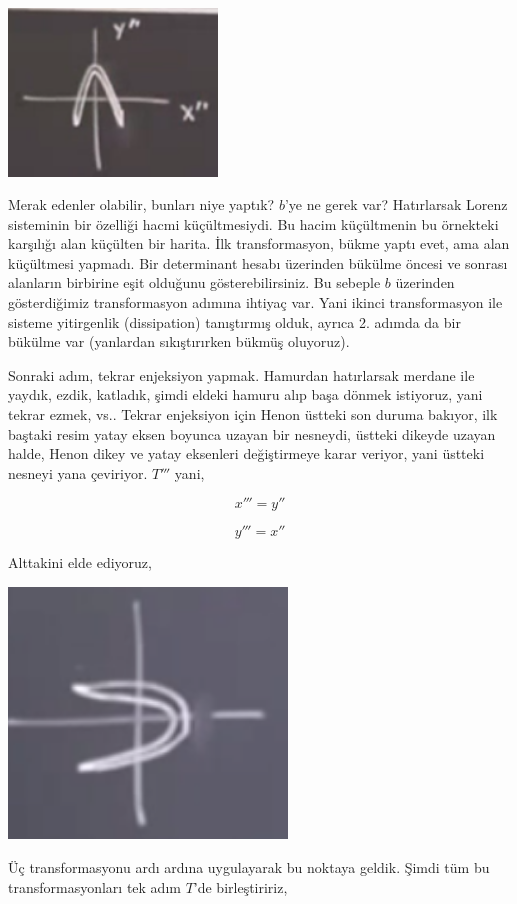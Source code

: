 \documentclass[12pt,fleqn]{article}\usepackage{../../common}
\begin{document}
\includegraphics[width=15em]{24_03.png}

Merak edenler olabilir, bunları niye yaptık? $b$'ye ne gerek var?
Hatırlarsak Lorenz sisteminin bir özelliği hacmi küçültmesiydi. Bu hacim
küçültmenin bu örnekteki karşılığı alan küçülten bir harita. İlk
transformasyon, bükme yaptı evet, ama alan küçültmesi yapmadı. Bir
determinant hesabı üzerinden bükülme öncesi ve sonrası alanların birbirine
eşit olduğunu gösterebilirsiniz. Bu sebeple $b$ üzerinden gösterdiğimiz
transformasyon adımına ihtiyaç var. Yani ikinci transformasyon ile sisteme
yitirgenlik (dissipation) tanıştırmış olduk, ayrıca 2. adımda da bir
bükülme var (yanlardan sıkıştırırken bükmüş oluyoruz).

Sonraki adım, tekrar enjeksiyon yapmak. Hamurdan hatırlarsak merdane ile
yaydık, ezdik, katladık, şimdi eldeki hamuru alıp başa dönmek istiyoruz,
yani tekrar ezmek, vs.. Tekrar enjeksiyon için Henon üstteki son duruma
bakıyor, ilk baştaki resim yatay eksen boyunca uzayan bir nesneydi, üstteki
dikeyde uzayan halde, Henon dikey ve yatay eksenleri değiştirmeye karar
veriyor, yani üstteki nesneyi yana çeviriyor. $T'''$ yani,

$$ x''' = y'' $$

$$ y''' = x'' $$

Alttakini elde ediyoruz,

\includegraphics[width=20em]{24_04.png}

Üç transformasyonu ardı ardına uygulayarak bu noktaya geldik. Şimdi tüm bu
transformasyonları tek adım $T$'de birleştiririz,
\end{document}
